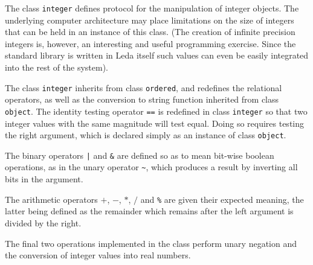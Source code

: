 The class {\tt integer} defines protocol for the manipulation of
integer objects.  The underlying computer architecture may place
limitations on the size of integers that can be held in an instance
of this class.  (The creation of infinite precision integers is, however,
an interesting and useful programming exercise.  Since the standard
library is written in Leda itself such values can even be easily
integrated into the rest of the system).

The class {\tt integer} inherits from class {\tt ordered}, and redefines
the relational operators, as well as the conversion to string
function inherited from class {\tt object}.  The identity testing
operator \verb+==+ is redefined in class {\tt integer} so that two
integer values with the same magnitude will test equal.
Doing so requires testing the right argument, which is declared simply
as an instance of class {\tt object}.

The binary operators \verb+|+ and \verb+&+ are defined so as to mean
bit-wise boolean operations, as in the unary operator \verb+~+, which
produces a result by inverting all bits in the argument.

The arithmetic operators $+$, $-$, $*$, $/$ and \verb+%+ are given
their expected meaning, the latter being defined as the remainder which
remains after the left argument is divided by the right.

The final two operations implemented in the class perform unary negation
and the conversion of integer values into real numbers.

